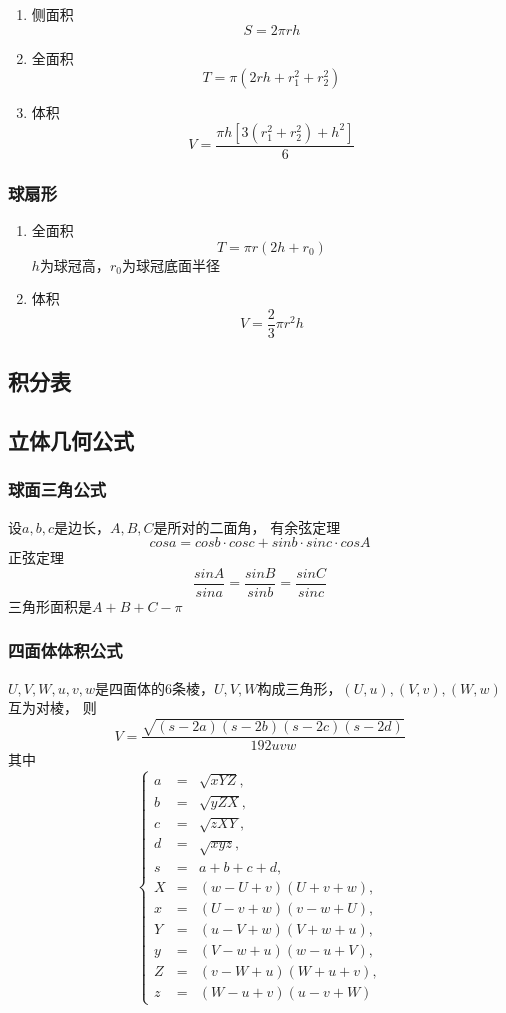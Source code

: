 \documentclass[a4paper]{ctexart}
\begin{document}
\begin{enumerate}
	\item 侧面积
	$$S=2\pi rh$$
	\item 全面积
	$$T=\pi(2rh+r_1^2+r_2^2)$$
	\item 体积
	$$V=\frac{\pi h[3(r_1^2+r_2^2)+h^2]}{6}$$
\end{enumerate}

\subsubsection{球扇形}

\begin{enumerate}
	\item 全面积
	$$T=\pi r(2h+r_0)$$
	$h$为球冠高，$r_0$为球冠底面半径
	\item 体积
	$$V=\frac{2}{3}\pi r^2h$$
\end{enumerate}

\subsection{积分表}


\subsection{立体几何公式}

\subsubsection{球面三角公式}

设$a, b, c$是边长，$A, B, C$是所对的二面角，
有余弦定理$$cos a = cos b \cdot cos c + sin b \cdot sin c \cdot cos A$$
正弦定理$$\frac{sin A}{sin a} = \frac{sin B}{sin b} = \frac{sin C}{sin c}$$
三角形面积是$A + B + C - \pi$

\subsubsection{四面体体积公式}

$U, V, W, u, v, w$是四面体的$6$条棱，$U, V, W$构成三角形，$(U, u), (V, v), (W, w)$互为对棱，
则$$V = \frac{\sqrt{(s - 2a)(s - 2b)(s - 2c)(s - 2d)}}{192 uvw}$$
其中$$\left\{\begin{array}{lll}
a & = & \sqrt{xYZ}, \\
b & = & \sqrt{yZX}, \\
c & = & \sqrt{zXY}, \\
d & = & \sqrt{xyz}, \\
s & = & a + b + c + d, \\ 
X & = & (w - U + v)(U + v + w), \\
x & = & (U - v + w)(v - w + U), \\
Y & = & (u - V + w)(V + w + u), \\
y & = & (V - w + u)(w - u + V), \\
Z & = & (v - W + u)(W + u + v), \\
z & = & (W - u + v)(u - v + W)
\end{array}\right.$$
\end{document}
